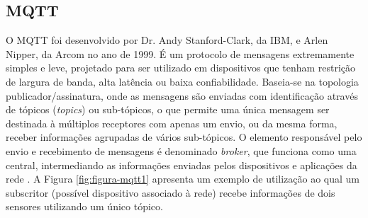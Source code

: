 \begin{alineascomponto}
\begin{figure}[!h]
        	    \end{figure}
        \end{alineascomponto}

    \subsection{MQTT}
    \label{sec:mqtt}

        O \gls{MQTT} foi desenvolvido por Dr. Andy Stanford-Clark, da IBM, e Arlen Nipper, da Arcom no ano de 1999. É um protocolo de mensagens extremamente simples e leve, projetado para ser utilizado em dispositivos que tenham restrição de largura de banda, alta latência ou baixa confiabilidade. Baseia-se na topologia publicador/assinatura, onde as mensagens são enviadas com identificação através de tópicos (\textit{topics}) ou sub-tópicos, o que permite uma única mensagem ser destinada à múltiplos receptores com apenas um envio, ou da mesma forma, receber informações agrupadas de vários sub-tópicos. O elemento responsável pelo envio e recebimento de mensagens é denominado \textit{broker}, que funciona como uma central, intermediando as informações enviadas pelos dispositivos e aplicações da rede \cite{MQTT}. A Figura \ref{fig:figura-mqtt1} apresenta um exemplo de utilização ao qual um subscritor (possível dispositivo associado à rede) recebe informações de dois sensores utilizando um único tópico.
        
